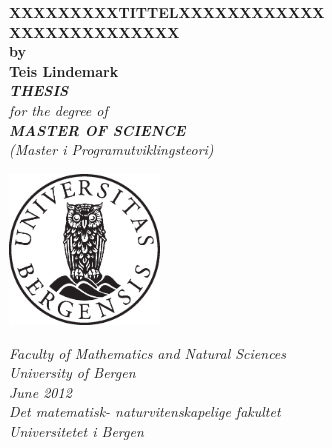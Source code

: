 \documentclass[12pt,twoside,onecolumn]{article}
\begin{document}
\thispagestyle{empty}
\begin{center}        %
  \vspace{5mm}          %
  \LARGE
  \textbf{XXXXXXXXXTITTELXXXXXXXXXXXX\\ XXXXXXXXXXXXXX} \\
  \Large
  \vspace{5mm}
  \textbf{by} \\
  \vspace{5mm}
  \large
  \textbf{Teis Lindemark} \\
  \vspace{30mm}
  \Large
  {\bf{\textsl{THESIS}}} \\
  \textsl{for the degree of} \\
  \vspace{2mm}
  {\bf{\textsl{MASTER OF SCIENCE}}} \\
  \vspace{5mm}
  {\large \textsl {(Master i Programutviklingsteori)}}\\
  \vspace{10mm}
  \centerline{\includegraphics[width=4cm,height=4cm]{uibugle}}
  \vspace{5mm}
  \textsl{Faculty of Mathematics and Natural Sciences} \\
  \textsl{University of Bergen} \\
  \vspace{10mm}
  \large
  \textsl{June 2012} \\
  \vspace{5mm}
  \normalsize
  \textsl{Det matematisk- naturvitenskapelige fakultet} \\
  \textsl{Universitetet i Bergen} \\
\end{center}
\end{document}

